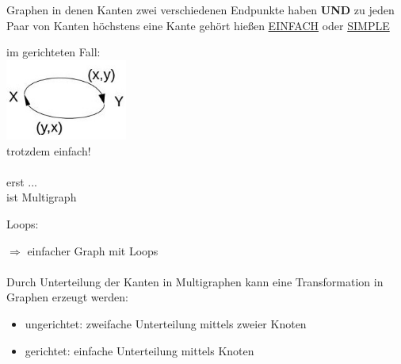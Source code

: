 Graphen in denen Kanten zwei verschiedenen Endpunkte haben \textbf{UND} zu jeden Paar von Kanten höchstens eine Kante gehört hießen \underline{EINFACH} oder \underline{SIMPLE}

im gerichteten Fall:\\
\includegraphics[width=0.3\textwidth]{lectures/161014/pix/1.jpg}
\\
trotzdem einfach!\\
\\
erst ... %
\\
ist Multigraph

Loops:

$\Rightarrow$ einfacher Graph mit Loops
\\\\
Durch Unterteilung der Kanten in Multigraphen kann eine Transformation in Graphen erzeugt werden:
\begin{itemize}
	\item ungerichtet: zweifache Unterteilung mittels zweier Knoten
	\item gerichtet: einfache Unterteilung mittels Knoten
\end{itemize}


